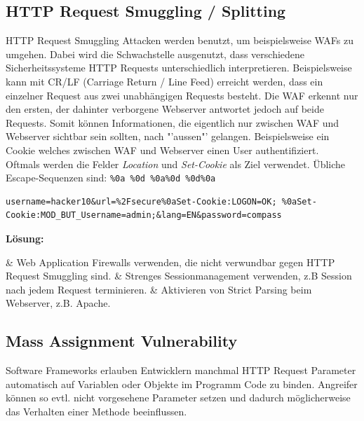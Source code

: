 \subsection{HTTP Request Smuggling / Splitting}
HTTP Request Smuggling Attacken werden benutzt, um beispielsweise WAFs zu umgehen. Dabei wird die Schwachstelle ausgenutzt, dass verschiedene Sicherheitssysteme HTTP Requests unterschiedlich interpretieren. Beispielsweise kann mit CR/LF (Carriage Return / Line Feed) erreicht werden, dass ein einzelner Request aus zwei unabhängigen Requests besteht. Die WAF erkennt nur den ersten, der dahinter verborgene Webserver antwortet jedoch auf beide Requests. Somit können Informationen, die eigentlich nur zwischen WAF und Webserver sichtbar sein sollten, nach "'aussen"' gelangen. Beispielsweise ein Cookie welches zwischen WAF und Webserver einen User authentifiziert.\\

Oftmals werden die Felder \textit{Location} und \textit{Set-Cookie} als Ziel verwendet. Übliche Escape-Sequenzen sind: \lstinline|%0a %0d %0a%0d %0d%0a|

\begin{lstlisting}[language={},caption=Beispiel eines präparierten Requests zur Umgehung einer Pre-Authentication]
username=hacker10&url=%2Fsecure%0aSet-Cookie:LOGON=OK; %0aSet-Cookie:MOD_BUT_Username=admin;&lang=EN&password=compass
\end{lstlisting}

\textbf{Lösung:}
\begin{easylist}
	& Web Application Firewalls verwenden, die nicht verwundbar gegen HTTP Request Smuggling sind.
	& Strenges Sessionmanagement verwenden, z.B Session nach jedem Request terminieren.
	& Aktivieren von Strict Parsing beim Webserver, z.B. Apache.
\end{easylist}

\subsection{Mass Assignment Vulnerability}
Software Frameworks erlauben Entwicklern manchmal HTTP Request Parameter automatisch auf Variablen oder Objekte im Programm Code zu binden. Angreifer können so evtl. nicht vorgesehene Parameter setzen und dadurch möglicherweise das Verhalten einer Methode beeinflussen.\\

